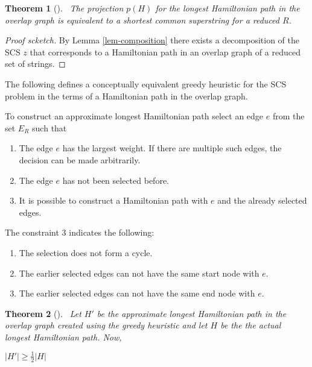 \documentclass[english,twoside,censored,csm,algorithms-track-2020]{HYthesisML}
\theoremstyle{plain}
\newtheorem{theorem}{Theorem}[chapter]
\theoremstyle{definition}
\begin{document}
\begin{theorem} [] ~\label{lem-similarity-between-SCS-Hamp}
  The projection $p(H)$ for the longest Hamiltonian path in the overlap graph is equivalent to
  a shortest common superstring for a reduced $R$.
\end{theorem}
\begin{proof}[Proof scketch]
By Lemma \ref{lem-composition} there exists a decomposition of the SCS $z$ that corresponds to a
Hamiltonian path in an overlap graph of a reduced set of strings.
\end{proof}

The following defines a conceptually equivalent greedy heuristic for the SCS problem in the terms of
a Hamiltonian path in the overlap graph.

To  construct an approximate longest Hamiltonian path select an edge $e$ from the set $E_R$ such that

\begin{enumerate}
\item The edge $e$ has the largest weight. If there are multiple such edges, the decision can be made arbitrarily.
\item The edge $e$ has not been selected before.
\item It is possible to construct a Hamiltonian path with $e$ and the already selected edges. 
\end{enumerate}

The constraint 3 indicates the following:
\begin{enumerate}[i]
\item The selection does not form a cycle.
\item The earlier selected edges can not have the same start node with $e$.
\item The earlier selected edges can not have the same end node with $e$.
\end{enumerate}






\begin{theorem}[]~\label{theorem-heuristic-bound}
  Let $H'$ be the approximate longest Hamiltonian path in the overlap graph created using
  the greedy heuristic and let $H$ be the the actual longest Hamiltonian path. Now,
  
  $|H'|\geq \frac{1}{2}|H|$
  
\end{theorem}
\end{document}
